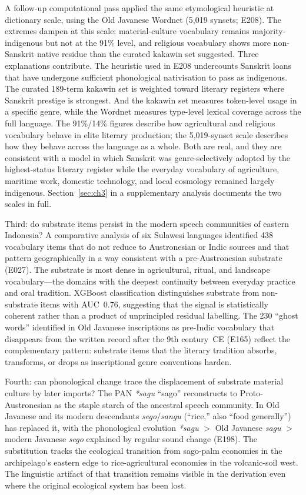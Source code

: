 \documentclass[12pt,a4paper]{article}
\begin{document}
A follow-up computational pass applied the same etymological heuristic at dictionary scale, using the Old Javanese Wordnet (5{,}019 synsets; E208). The extremes dampen at this scale: material-culture vocabulary remains majority-indigenous but not at the 91\% level, and religious vocabulary shows more non-Sanskrit native residue than the curated kakawin set suggested. Three explanations contribute. The heuristic used in E208 undercounts Sanskrit loans that have undergone sufficient phonological nativisation to pass as indigenous. The curated 189-term kakawin set is weighted toward literary registers where Sanskrit prestige is strongest. And the kakawin set measures token-level usage in a specific genre, while the Wordnet measures type-level lexical coverage across the full language. The 91\%/14\% figures describe how agricultural and religious vocabulary behave in elite literary production; the 5{,}019-synset scale describes how they behave across the language as a whole. Both are real, and they are consistent with a model in which Sanskrit was genre-selectively adopted by the highest-status literary register while the everyday vocabulary of agriculture, maritime work, domestic technology, and local cosmology remained largely indigenous. Section~\ref{sec:ch3} in a supplementary analysis documents the two scales in full.

Third: do substrate items persist in the modern speech communities of eastern Indonesia? A comparative analysis of six Sulawesi languages identified 438 vocabulary items that do not reduce to Austronesian or Indic sources and that pattern geographically in a way consistent with a pre-Austronesian substrate (E027). The substrate is most dense in agricultural, ritual, and landscape vocabulary---the domains with the deepest continuity between everyday practice and oral tradition. XGBoost classification distinguishes substrate from non-substrate items with AUC~0.76, suggesting that the signal is statistically coherent rather than a product of unprincipled residual labelling. The 230 ``ghost words'' identified in Old Javanese inscriptions as pre-Indic vocabulary that disappears from the written record after the 9th century~CE (E165) reflect the complementary pattern: substrate items that the literary tradition absorbs, transforms, or drops as inscriptional genre conventions harden.

Fourth: can phonological change trace the displacement of substrate material culture by later imports? The PAN \textit{*sagu} ``sago'' reconstructs to Proto-Austronesian as the staple starch of the ancestral speech community. In Old Javanese and its modern descendants \textit{sego}/\textit{sangu} (``rice,'' also ``food generally'') has replaced it, with the phonological evolution \textit{*sagu} $>$ Old Javanese \textit{sagu} $>$ modern Javanese \textit{sego} explained by regular sound change (E198). The substitution tracks the ecological transition from sago-palm economies in the archipelago's eastern edge to rice-agricultural economies in the volcanic-soil west. The linguistic artifact of that transition remains visible in the derivation even where the original ecological system has been lost.
\end{document}
